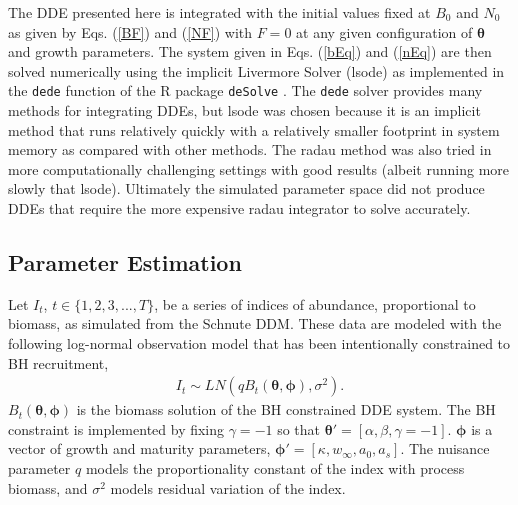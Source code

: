 %
The DDE presented here is integrated with the initial values fixed at $B_0$
and $N_0$ as given by Eqs. (\ref{BF}) and (\ref{NF}) with $F=0$ at any given
configuration of $\bm{\theta}$ and growth parameters. %
The system given in Eqs. (\ref{bEq}) and (\ref{nEq}) are then solved
numerically using the implicit Livermore Solver (lsode) as implemented in the
\verb|dede| function of the R package \verb|deSolve| \cite{soetaert_solving_2010}.
The \verb|dede| solver provides many methods for integrating DDEs, but lsode
was chosen because it is an implicit method that runs relatively quickly with
a relatively smaller footprint in system memory as compared with other methods.
The radau method was also tried in more computationally challenging settings
with good results (albeit running more slowly that lsode). Ultimately the
simulated parameter space did not produce DDEs that require the more expensive
radau integrator to solve accurately.

%

%
\subsection{Parameter Estimation}

%
Let $I_t$, $t\in\{1,2,3,...,T\}$, be a series of indices of abundance, 
proportional to biomass, as simulated from the Schnute DDM. These data 
are modeled with the following log-normal observation model that has been 
intentionally constrained to BH recruitment, 
%
\begin{align}
I_t \sim LN(q B_t(\bm{\theta}, \bm{\phi}), \sigma^2). \label{bL}
\end{align}
%
$B_t(\bm{\theta}, \bm{\phi})$ is the biomass solution of the BH constrained DDE system. %
The BH constraint is implemented by fixing $\gamma=-1$ so that $\bm{\theta}'=[\alpha, \beta, \gamma=-1]$. 
$\bm{\phi}$ is a vector of growth and maturity parameters, 
$\bm{\phi}'=[\kappa, w_\infty, a_0, a_s]$. The nuisance parameter $q$ models 
the proportionality constant of the index with process biomass, and $\sigma^2$ 
models residual variation of the index.

